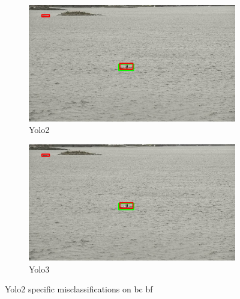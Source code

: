 \begin{figure}[h!]
\begin{subfigure}{.5\textwidth}
  \centering
  \includegraphics[width=0.9\linewidth]{results/case_buildings/yolo23/samemistake/yolo2/selected_08_07_frame13555.jpg}
  \caption{Yolo2}
\end{subfigure}%
\begin{subfigure}{.5\textwidth}
  \centering
  \includegraphics[width=.9\linewidth]{results/case_buildings/yolo23/samemistake/yolo2/selected_08_07_frame13555.jpg}
  \caption{Yolo3}
\end{subfigure}
\caption{Yolo2 specific misclassifications on bc bf}
\label{img:yolo2_misclas}


\end{figure}

